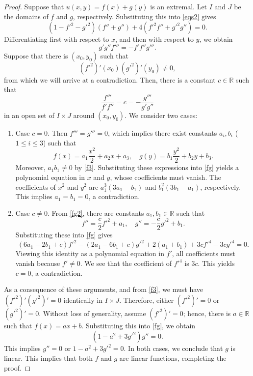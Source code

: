 \documentclass[a4paper,12pt]{amsart}
\theoremstyle{definition}
\def\r{\mathbb R}
\begin{document}
\begin{proof} Suppose that $u(x,y)=f(x)+g(y)$ is an extremal.  Let $I$ and $J$ be the domains of $f$ and $g$, respectively. 
Substituting this into \eqref{eqs2} gives 
\begin{equation}\label{fg}
(1-f'^2-g'^2)(f''+g'')+4(f'^2f''+g'^2 g'')=0.
\end{equation}
Differentiating first with respect to $x$, and then with respect to $y$, we obtain
\begin{equation}\label{fg2}
g'g''f'''=-f'f'' g'''.
\end{equation}
Suppose that there is $(x_0,y_0)$ such that \begin{equation}\label{f3}
(f'^2)'(x_0)(g'^2)'(y_0)\not=0,
\end{equation}
from which we will arrive at a contradiction.  Then, there is a constant $c\in\r$ such that 
$$\frac{f'''}{f'f''}=c=-\frac{g'''}{g'g''}$$
in an open set of $I\times J$ around $(x_0,y_0)$. 
We consider two cases:
\begin{enumerate}
\item Case $c=0$. Then $f'''=g'''=0$, which implies there exist constants $a_i,b_i$ ($1\leq i\leq 3$) such that
$$f(x)=a_1\frac{x^2}{2}+a_2x+a_3,\quad g(y)=b_1\frac{y^2}{2}+b_2y+b_3.$$
Moreover, $a_1b_1\not=0$ by \eqref{f3}.   Substituting these expressions into \eqref{fg} yields a polynomial equation in $x$ and $y$, whose  coefficients must vanish. The coefficients of $x^2$ and $y^2$ are $a_1^3(3a_1-b_1)$ and $b_1^2(3b_1-a_1)$, respectively. This implies $a_1=b_1=0$,   a contradiction. 
\item Case $c\not=0$. From \eqref{fg2},  there are constants $a_1, b_1\in\r$ such that 
$$f''=\frac{c}{2}f'^2+a_1,\quad g''=-\frac{c}{2}g'^2+b_1.$$
Substituting these into \eqref{fg} gives
$$ (6 a_1-2 b_1+c) f'^2-(2 a_1-6 b_1+c) g'^2+2 (a_1+b_1)+3 c f'^4-3 c g'^4 =0.$$
Viewing  this identity  as a polynomial equation in $f'$, all coefficients must vanish because $f'\not=0$. We see that the coefficient of $f'^4$ is  $3c$. This yields $c=0$, a contradiction. 
\end{enumerate}

As a consequence of these arguments, and from \eqref{f3}, we must have $(f'^2)' (g'^2)' =0$   identically in $I\times J$. Therefore, either $(f'^2)'=0$ or $(g'^2)'=0$. Without loss of generality,   assume $(f'^2)'=0$; hence, there is  $a\in\r$ such that $f(x)=ax+b$. Substituting this into \eqref{fg}, we obtain
$$(1-a^2+3g'^2)g''=0.$$
This implies $g''=0$ or $1-a^2+3g'^2=0$. In both cases, we conclude that $g$ is linear. This implies that both $f$ and $g$ are linear functions,  completing  the proof.
\end{proof}
\end{document}
